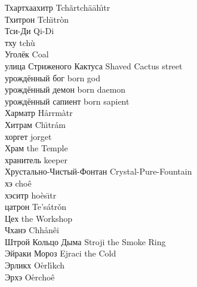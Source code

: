 \documentclass[a4paper,10pt,fleqn]{book}
\begin{document}
Тхартхаахитр \hfill Tch\~{a}rtch\"{a}\={a}h\r{\i}tr\\
Тхитрон \hfill Tch\"{\i}tr\`{o}n\\
Тси-Ди \hfill Qi-Di\\
тху \hfill tch\`{u}\\
Уголёк \hfill Coal\\
улица Стриженого Кактуса \hfill Shaved Cactus street\\
урождённый бог \hfill born god\\
урождённый демон \hfill born daemon\\
урождённый сапиент \hfill born sapient\\
Харматр \hfill H\r{a}rrm\`{a}tr\\
Хитрам \hfill Ch\"{\i}tr\'{a}m\\
хоргет \hfill jorget\\
Храм \hfill the Temple\\
хранитель \hfill keeper\\
Хрустально-Чистый-Фонтан \hfill Crystal-Pure-Fountain\\
хэ \hfill cho\^{e}\\
хэситр \hfill ho\`{e}s\={\i}tr\\
цатрон \hfill Te's\'{a}tr\v{o}n\\
Цех \hfill the Workshop\\
Чханэ \hfill Chh\r{a}n\^{e}i\\
Штрой Кольцо Дыма \hfill Stroji the Smoke Ring\\
Эйраки Мороз \hfill Ejraci the Cold\\
Эрликх \hfill O\r{e}rl\'{\i}kch\\
Эрхэ \hfill O\r{e}rcho\^{e}\\
\end{document}
